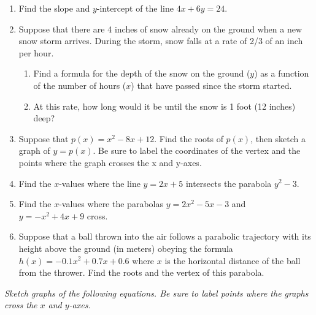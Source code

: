 \documentclass[11pt]{article}
\begin{document}
\begin{enumerate}
\setcounter{enumi}{\theenumCount}
\item Find the slope and $y$-intercept of the line $4x + 6y = 24$.
\vfill


\item Suppose that there are 4 inches of snow already on the ground when a new snow storm arrives.  During the storm, snow falls at a rate of 2/3 of an inch per hour.  
\begin{enumerate}
\item Find a formula for the depth of the snow on the ground ($y$) as a function of the number of hours ($x$) that have passed since the storm started. 
\vfill

\item At this rate, how long would it be until the snow is 1 foot (12 inches) deep?  
\vfill
\end{enumerate}

\item Suppose that $p(x) = x^2 - 8x + 12$. Find the roots of $p(x)$, then sketch a graph of $y = p(x)$.  Be sure to label the coordinates of the vertex and the points where the graph crosses the x and y-axes. 
\vfill

\item Find the $x$-values where the line $y = 2x + 5$ intersects the parabola $y^2 - 3$. 
\vfill


\newpage

\item Find the $x$-values where the parabolas $y = 2x^2 - 5x - 3$ and $y = -x^2 + 4x + 9$ cross. 
\vfill

\item Suppose that a ball thrown into the air follows a parabolic trajectory with its height above the ground (in meters) obeying the formula $h(x) = -0.1x^2 + 0.7x + 0.6$ where $x$ is the horizontal distance of the ball from the thrower.  Find the roots and the vertex of this parabola.  
\vfill


\setcounter{enumCount}{\theenumi}
\end{enumerate}

\noindent
\textit{Sketch graphs of the following equations.  Be sure to label points where the graphs cross the $x$ and $y$-axes.}
\end{document}
